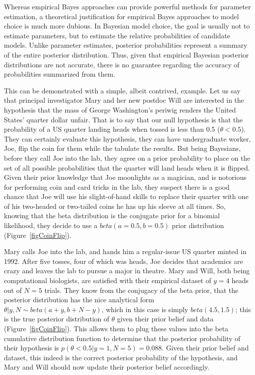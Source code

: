 \documentclass[letterpaper,12pt]{article}
\begin{document}
\begin{linenumbers}
Whereas empirical Bayes approaches can provide powerful methods for parameter
estimation, a theoretical justification for empirical Bayes approaches to model
choice is much more dubious.
In Bayesian model choice, the goal is usually not to estimate parameters, but
to estimate the relative probabilities of candidate models.
Unlike parameter estimates, posterior probabilities represent a summary of the
entire posterior distribution.
Thus, given that empirical Bayesian posterior distributions are not accurate,
there is no guarantee regarding the accuracy of probabilities summarized from
them.

This can be demonstrated with a simple, albeit contrived, example.
Let us say that principal investigator Mary and her new postdoc Will are
interested in the hypothesis that the mass of George Washington's periwig
renders the United States' quarter dollar unfair.
That is to say that our null hypothesis is that the probability of a US quarter
landing heads when tossed is less than 0.5 ($\theta < 0.5$).
They can certainly evaluate this hypothesis, they can have undergraduate
worker, Joe, flip the coin for them while the tabulate the results.
But being Bayesians, before they call Joe into the lab, they agree on a
prior probability to place on the set of all possible probabilities that
the quarter will land heads when it is flipped.
Given their prior knowledge that Joe moonlights as a magician, and is notorious
for performing coin and card tricks in the lab, they suspect there is a good
chance that Joe will use his slight-of-hand skills to replace their quarter
with one of his two-headed or two-tailed coins he has up his sleeve at all
times.
So, knowing that the beta distribution is the conjugate prior for a binomial
likelihood, they decide to use a $beta(a=0.5, b=0.5)$ prior distribution
(Figure~\ref{figCoinFlip}).

Mary calls Joe into the lab, and hands him a regular-issue US quarter minted in
1992.
After five tosses, four of which was heads, Joe decides that academics are
crazy and leaves the lab to pursue a major in theatre.  Mary and Will, both
being computational biologists, are satisfied with their
empirical dataset of $y = 4$ heads out of $N = 5$ trials.
They know from the conjugacy of the beta prior, that the posterior distribution
has the nice analytical form $\theta|y,N \sim beta(a + y, b + N - y)$, which
in this case is simply $beta(4.5, 1.5)$; this is the true posterior distribution
of $\theta$ given their prior belief and data (Figure~\ref{figCoinFlip}).
This allows them to plug these values into the beta cumulative distribution
function to determine that the posterior probability of their hypothesis is
$p(\theta < 0.5 | y=1, N=5) = 0.088$.
Given their prior belief and dataset, this indeed is the correct posterior
probability of the hypothesis, and Mary and Will should now update their
posterior belief accordingly.


\end{linenumbers}
\end{document}
